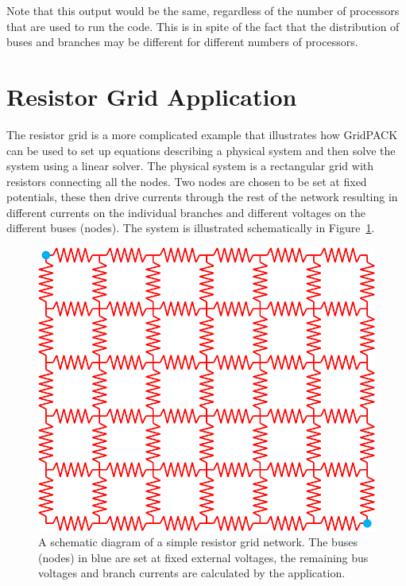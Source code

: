 \documentclass[12pt]{report} %
\begin{document}
Note that this output would be the same, regardless of the number of processors that are used to run the code. This is in spite of the fact that the distribution of buses and branches may be different for different numbers of processors.

\section{Resistor Grid Application}

The resistor grid is a more complicated example that illustrates how GridPACK can be used to set up equations describing a physical system and then solve the system using a linear solver. The physical system is a rectangular grid with resistors connecting all the nodes. Two nodes are chosen to be set at fixed potentials, these then drive currents through the rest of the network resulting in different currents on the individual branches and different voltages on the different buses (nodes). The system is illustrated schematically in Figure~\ref{fig:fig-14}.

\begin{figure}
  \centering
    \includegraphics*[width=5in, keepaspectratio=true]{Fig14}
  \caption{A schematic diagram of a simple resistor grid network. The buses (nodes) in blue are set at fixed external voltages, the remaining bus voltages and branch currents are calculated by the application.}
  \label{fig:fig-14}
\end{figure}


\end{document}
